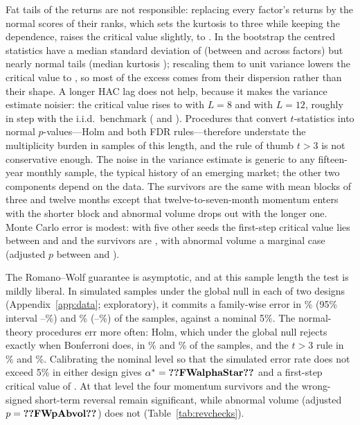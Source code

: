 \documentclass[11pt]{article}
\newcommand{\RW}{Romano--Wolf}
\begin{document}
Fat tails of the returns are not responsible:
replacing every factor's returns by the normal scores of their ranks, which sets the kurtosis to three while keeping the
dependence, raises the critical value slightly, to . In the bootstrap the centred statistics have
a median standard deviation of  (between  and  across factors) but nearly
normal tails (median kurtosis ); rescaling them to unit variance lowers the critical value to
, so most of the excess comes from their dispersion rather than their shape. A longer HAC lag does not help, because
it makes the variance estimate noisier: the critical value rises to  with $L=8$ and
 with $L=12$, roughly in step with the i.i.d.\ benchmark ( and ). Procedures that convert $t$-statistics into normal $p$-values---Holm and both FDR rules---therefore understate
the multiplicity burden in samples of this length, and the rule of thumb $t>3$ is not conservative enough. The noise in
the variance estimate is generic to any fifteen-year monthly sample, the typical history of an emerging market; the
other two components depend on the data. The survivors are the same with mean blocks of three and twelve months except that
twelve-to-seven-month momentum enters with the shorter block and abnormal volume drops out with the longer one. Monte
Carlo error is modest: with five other seeds the first-step critical value lies between  and
 and the survivors are , with abnormal volume a marginal case (adjusted $p$ between
 and ).

The \RW{} guarantee is asymptotic, and at this sample length the test is mildly liberal. In  simulated
samples under the global null in each of two designs (Appendix~\ref{app:data}; exploratory), it commits a family-wise
error in \% (95\% interval --\%) and \%
(--\%) of the samples, against a nominal 5\%. The normal-theory procedures err more
often: Holm, which under the global null rejects exactly when Bonferroni does, in \% and
\% of the samples, and the $t>3$ rule in \% and \%. Calibrating the
nominal level so that the simulated error rate does not exceed 5\% in either design gives $\alpha^\ast=\val{FWalphaStar}$
and a first-step critical value of . At that level the four momentum survivors and the wrong-signed
short-term reversal remain significant, while abnormal volume (adjusted $p=\val{FWpAbvol}$) does not
(Table~\ref{tab:revchecks}).
\end{document}
